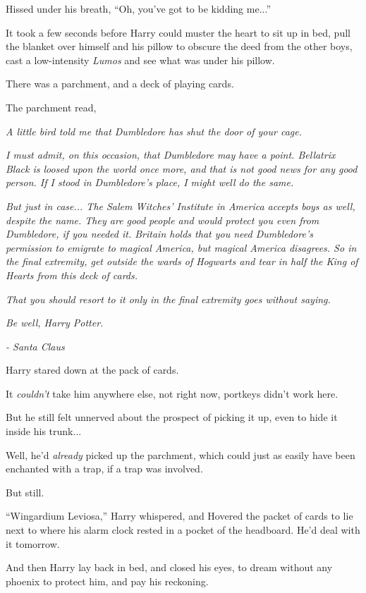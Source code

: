 Hissed under his breath, ``Oh, you've got to be kidding me...''

It took a few seconds before Harry could muster the heart to sit up in
bed, pull the blanket over himself and his pillow to obscure the deed
from the other boys, cast a low-intensity \emph{Lumos} and see what was
under his pillow.

There was a parchment, and a deck of playing cards.

The parchment read,

\emph{A little bird told me that Dumbledore has shut the door of your
cage.}

\emph{I must admit, on this occasion, that Dumbledore may have a point.
Bellatrix Black is loosed upon the world once more, and that is not good
news for any good person. If I stood in Dumbledore's place, I might well
do the same.}

\emph{But just in case... The Salem Witches' Institute in America
accepts boys as well, despite the name. They are good people and would
protect you even from Dumbledore, if you needed it. Britain holds that
you need Dumbledore's permission to emigrate to magical America, but
magical America disagrees. So in the final extremity, get outside the
wards of Hogwarts and tear in half the King of Hearts from this deck of
cards.}

\emph{That you should resort to it only in the final extremity goes
without saying.}

\emph{Be well, Harry Potter.}

\emph{- Santa Claus}

Harry stared down at the pack of cards.

It \emph{couldn't} take him anywhere else, not right now, portkeys
didn't work here.

But he still felt unnerved about the prospect of picking it up, even to
hide it inside his trunk...

Well, he'd \emph{already} picked up the parchment, which could just as
easily have been enchanted with a trap, if a trap was involved.

But still.

``Wingardium Leviosa,'' Harry whispered, and Hovered the packet of cards
to lie next to where his alarm clock rested in a pocket of the
headboard. He'd deal with it tomorrow.

And then Harry lay back in bed, and closed his eyes, to dream without
any phoenix to protect him, and pay his reckoning.

